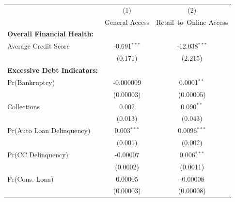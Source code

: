\begin{tabular}{@{\extracolsep{5pt}} lcc} 
\toprule
\midrule
 & (1) & (2) \\
   & General Access  & Retail--to--Online Access  \\ 
\midrule
\textbf{Overall Financial Health:}  &  &  \\ 
\enspace Average Credit Score & -0.691$^{***}$ & -12.038$^{***}$ \\ 
 & (0.171) & (2.215) \\ 
\addlinespace  
 \textbf{Excessive Debt Indicators:}  &  &  \\ 
\enspace Pr(Bankruptcy) & -0.000009 & 0.0001$^{**}$ \\ 
 & (0.00003) & (0.00005) \\ 
 \addlinespace   
\enspace Collections & 0.002 & 0.090$^{**}$ \\ 
 & (0.013) & (0.043) \\
 \addlinespace  
\enspace Pr(Auto Loan Delinquency) & 0.003$^{***}$ & 0.0096$^{***}$ \\ 
  & (0.001) & (0.002) \\ 
  \addlinespace  
 \enspace Pr(CC Delinquency) & -0.00007 & 0.006$^{***}$ \\ 
  & (0.0002) & (0.0011) \\ 
  \addlinespace  
 \enspace Pr(Cons. Loan) & 0.00005 & -0.00008 \\ 
  & (0.00003) & (0.00008) \\ 

 \bottomrule 
\end{tabular}